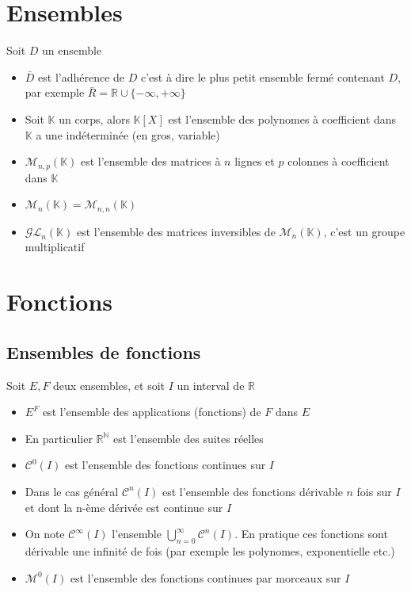 \documentclass[11pt,colorlinks]{book}
\theoremstyle{mytheoremstyle}
\theoremstyle{mytheoremstyle}
\theoremstyle{mytheoremstyle}
\theoremstyle{mytheoremstyle}
\theoremstyle{mytheoremstyle}
\theoremstyle{mytheoremstyle}
\theoremstyle{mytheoremstyle}
\theoremstyle{mytheoremstyle}
\theoremstyle{myproblemstyle}
\def\mbb#1{\mathbb{#1}}
\def\mfc#1{\mathcal{#1}}
\def\bN{\mbb{N}}
\def\bR{\mbb{R}}
\def\mC{\mathcal{C}}
\def\mM{\mathcal{M}}
\def\bK{\mbb{K}}
\def\rN{\bR^{\bN}}
\begin{document}
\section{Ensembles}
\begin{rmq}
  Soit $D$ un ensemble
  \begin{itemize}
    \item $\bar{D}$ est l'adhérence de $D$ c'est à dire le plus 
    petit ensemble fermé contenant $D$, par exemple $\bar{R} = \bR \cup \{-\infty,+\infty\}$
    \item Soit $\bK$ un corps, alors $\bK[X]$ est l'ensemble des polynomes 
    à coefficient dans $\bK$ a une indéterminée (en gros, variable)
    \item $\mfc{M}_{n,p}(\bK)$ est l'ensemble des matrices à $n$ lignes et $p$ colonnes à coefficient dans $\bK$
    \item $\mfc{M}_{n}(\bK) = \mfc{M}_{n,n}(\bK)$
    \item $\mfc{GL}_n(\bK)$ est l'ensemble des matrices inversibles de $\mfc{M}_n(\bK)$, c'est un groupe multiplicatif
  \end{itemize}
\end{rmq}
\section{Fonctions}
\subsection{Ensembles de fonctions}
\begin{rmq}
  Soit $E,F$ deux ensembles, et soit $I$ un interval de $\bR$
  \begin{itemize}
    \item $E^{F}$ est l'ensemble des applications (fonctions) de $F$ dans $E$
    \item En particulier $\rN$ est l'ensemble des suites réelles
    \item $\mC^0(I)$ est l'ensemble des fonctions continues sur $I$
    \item Dans le cas général $\mC^n(I)$ est l'ensemble des fonctions dérivable $n$ fois sur $I$ et 
    dont la n-ème dérivée est continue sur $I$
    \item On note $\mC^{\infty}(I)$ l'ensemble $\bigcup_{n=0}^{\infty} \mC^n(I)$. En pratique ces fonctions 
    sont dérivable une infinité de fois (par exemple les polynomes, exponentielle etc.)
    \item $\mM^0(I)$ est l'ensemble des fonctions continues par morceaux sur $I$
  \end{itemize}
\end{rmq}
\end{document}
